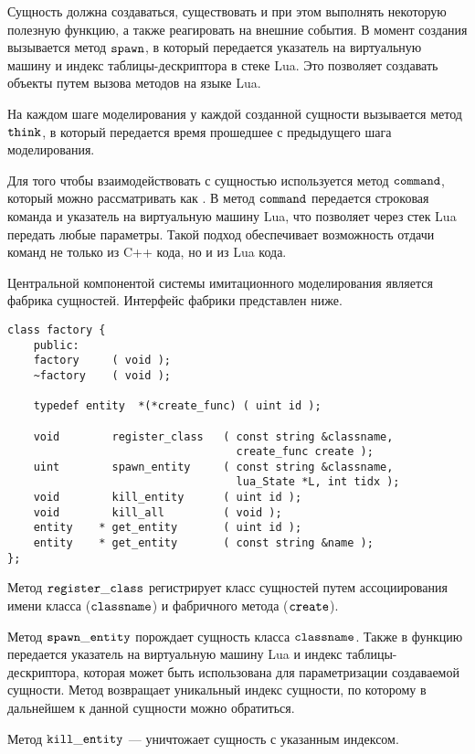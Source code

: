 Сущность должна создаваться, существовать и при этом выполнять некоторую полезную функцию, а также реагировать на внешние события.
В момент создания вызывается метод $\tt spawn$, в который передается указатель на виртуальную машину и индекс таблицы-дескриптора в стеке Lua. Это позволяет создавать объекты путем вызова методов на языке Lua.

На каждом шаге моделирования у каждой созданной сущности вызывается метод $\tt think$, в который передается время прошедшее с предыдущего шага моделирования.

Для того чтобы взаимодействовать с сущностью используется метод $\tt command$, который можно рассматривать как . В метод $\tt command$ передается строковая команда и указатель на виртуальную машину Lua, что позволяет через стек Lua передать любые параметры. Такой подход обеспечивает возможность отдачи команд не только из C++ кода, но и из Lua кода.


Центральной компонентой системы имитационного моделирования является фабрика сущностей.
Интерфейс фабрики представлен ниже.

\begin{lstlisting}[caption={Интерфейс фабрики сущностей}]
class factory {
    public:
    factory     ( void );
    ~factory    ( void );

    typedef	entity	*(*create_func)	( uint id );

    void        register_class   ( const string &classname, 
                                   create_func create );
    uint        spawn_entity     ( const string &classname, 
                                   lua_State *L, int tidx );
    void        kill_entity      ( uint id );
    void        kill_all         ( void );
    entity    * get_entity       ( uint id );
    entity    * get_entity       ( const string &name );
};
\end{lstlisting}

Метод $\tt register\_class$ регистрирует класс сущностей путем ассоциирования имени класса ($\tt classname$) и фабричного метода ($\tt create$).

Метод $\tt spawn\_entity$ порождает сущность класса $\tt classname$. 
Также в функцию передается указатель на виртуальную машину Lua и индекс таблицы-дескриптора, которая может быть использована для параметризации создаваемой сущности.
Метод возвращает уникальный индекс сущности, по которому в дальнейшем к данной сущности можно обратиться.

Метод $\tt kill\_entity$ --- уничтожает сущность с указанным индексом.

